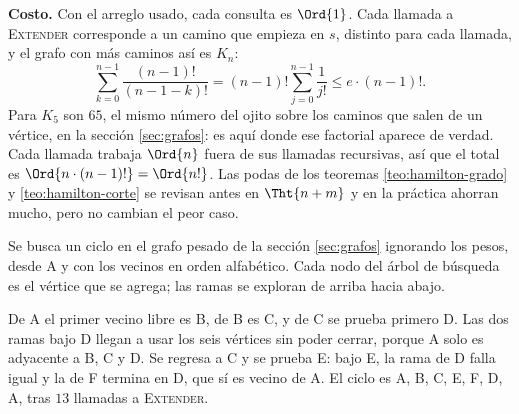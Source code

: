 \documentclass[11pt,letterpaper]{article}
\begin{document}
\textbf{Costo.} Con el arreglo $\text{usado}$, cada consulta es
$\Ord{1}$. Cada llamada a \textsc{Extender} corresponde a un camino
que empieza en $s$, distinto para cada llamada, y el grafo con más
caminos así es $K_n$:
\[
  \sum_{k=0}^{n-1} \frac{(n-1)!}{(n-1-k)!}
  = (n-1)! \sum_{j=0}^{n-1} \frac{1}{j!} \le e \cdot (n-1)! .
\]
Para $K_5$ son $65$, el mismo número del ojito sobre los caminos que
salen de un vértice, en la sección \ref{sec:grafos}: es aquí donde ese
factorial aparece de verdad. Cada llamada trabaja $\Ord{n}$ fuera de
sus llamadas recursivas, así que el total es
$\Ord{n \cdot (n-1)!} = \Ord{n!}$. Las podas de los teoremas
\ref{teo:hamilton-grado} y
\ref{teo:hamilton-corte} se revisan antes en $\Tht{n + m}$ y en la
práctica ahorran mucho, pero no cambian el peor caso.

\begin{ejemplo}
  \label{ej:hamilton-traza}
  Se busca un ciclo en el grafo pesado de la sección \ref{sec:grafos}
  ignorando los pesos, desde A y con los vecinos en orden
  alfabético. Cada nodo del árbol de búsqueda es el vértice que se
  agrega; las ramas se exploran de arriba hacia abajo.
  \begin{center}
  \end{center}
  De A el primer vecino libre es B, de B es C, y de C se prueba
  primero D. Las dos ramas bajo D llegan a usar los seis vértices sin
  poder cerrar, porque A solo es adyacente a B, C y D. Se regresa a C
  y se prueba E: bajo E, la rama de D falla igual y la de F termina en
  D, que sí es vecino de A. El ciclo es A, B, C, E, F, D, A, tras $13$
  llamadas a \textsc{Extender}.
\end{ejemplo}
\end{document}
